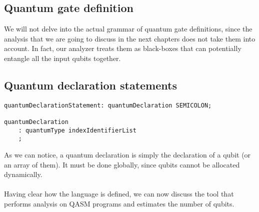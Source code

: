 \documentclass[12pt,a4paper]{report}
\theoremstyle{definition}
\theoremstyle{definition}
\theoremstyle{definition}
\begin{document}
\subsection{Quantum gate definition}
We will not delve into the actual grammar of quantum gate definitions, since the analysis that we are going to discuss in the next chapters does not take them into account. In fact, our analyzer treats them as black-boxes that can potentially entangle all the input qubits together.


\subsection{Quantum declaration statements}
\begin{lstlisting}
quantumDeclarationStatement: quantumDeclaration SEMICOLON;

quantumDeclaration
    : quantumType indexIdentifierList
    ;
\end{lstlisting}
As we can notice, a quantum declaration is simply the declaration of a qubit (or an array of them). It must be done globally, since qubits cannot be allocated dynamically.\\\\
Having clear how the language is defined, we can now discuss the tool that performs analysis on QASM programs and estimates the number of qubits.
\end{document}

